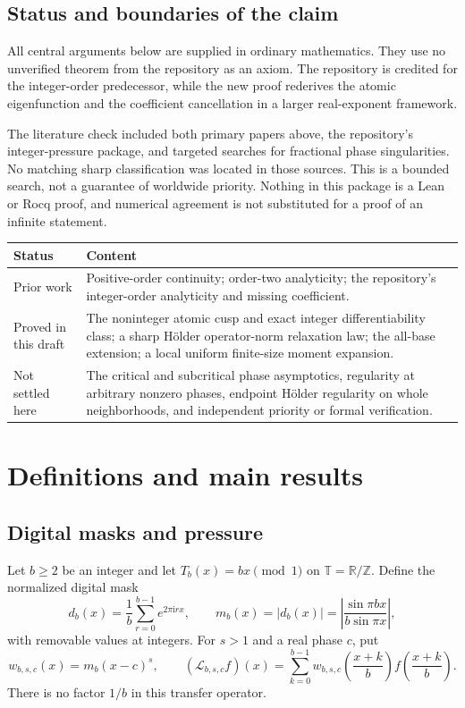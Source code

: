 \documentclass[11pt,a4paper]{article}
\numberwithin{equation}{section}
\theoremstyle{definition}
\theoremstyle{remark}
\newcommand{\TT}{\mathbb T}
\newcommand{\RR}{\mathbb R}
\newcommand{\ZZ}{\mathbb Z}
\newcommand{\ii}{\mathrm i}
\newcommand{\Lop}{\mathcal L}
\begin{document}
\subsection{Status and boundaries of the claim}
All central arguments below are supplied in ordinary mathematics. They
use no unverified theorem from the repository as an axiom. The repository
is credited for the integer-order predecessor, while the new proof
rederives the atomic eigenfunction and the coefficient cancellation in a
larger real-exponent framework.

The literature check included both primary papers above, the repository's
integer-pressure package, and targeted searches for fractional phase
singularities. No matching sharp classification was located in those
sources. This is a bounded search, not a guarantee of worldwide priority.
Nothing in this package is a Lean or Rocq proof, and numerical agreement
is not substituted for a proof of an infinite statement.

\begin{center}
\begin{tabular}{@{}p{}p{}@{}}
\toprule
\textbf{Status} & \textbf{Content}\\
\midrule
Prior work & Positive-order continuity; order-two analyticity; the repository's
integer-order analyticity and missing coefficient.\\[1.5mm]
Proved in this draft & The noninteger atomic cusp and exact integer differentiability
class; a sharp H\"older operator-norm relaxation law; the all-base extension;
a local uniform finite-size moment expansion.\\[1.5mm]
Not settled here & The critical and subcritical phase asymptotics, regularity at
arbitrary nonzero phases, endpoint H\"older regularity on whole neighborhoods,
and independent priority or formal verification.\\
\bottomrule
\end{tabular}
\end{center}

\section{Definitions and main results}
\label{sec:main}

\subsection{Digital masks and pressure}
Let $b\ge2$ be an integer and let $T_b(x)=bx\pmod1$ on
$\TT=\RR/\ZZ$. Define the normalized digital mask
\begin{equation}
 d_b(x)=\frac1b\sum_{r=0}^{b-1}e^{2\pi\ii rx},\qquad
 m_b(x)=|d_b(x)|
 =\left|\frac{\sin\pi bx}{b\sin\pi x}\right|,
 \label{eq:mask}
\end{equation}
with removable values at integers. For $s>1$ and a real phase $c$, put
\begin{equation}
 w_{b,s,c}(x)=m_b(x-c)^s,\qquad
 (\Lop_{b,s,c}f)(x)=\sum_{k=0}^{b-1}
 w_{b,s,c}\left(\frac{x+k}{b}\right)f\left(\frac{x+k}{b}\right).
 \label{eq:operator}
\end{equation}
There is no factor $1/b$ in this transfer operator.
\end{document}
